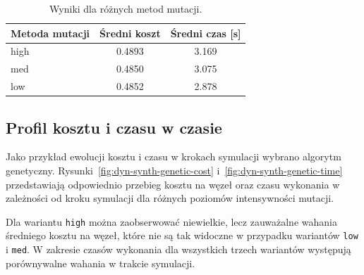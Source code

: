 \begin{table}[H]
    \centering
    \caption{Wyniki dla różnych metod mutacji.}
    \label{tab:dyn-synth-warm}
    \begin{tabular}{lcc}
        \toprule
        \textbf{Metoda mutacji} & \textbf{Średni koszt} & \textbf{Średni czas [s]} \\
        \midrule
        high                    & 0.4893                & 3.169                    \\
        med                     & 0.4850                & 3.075                    \\
        low                     & 0.4852                & 2.878                    \\
        \bottomrule
    \end{tabular}
\end{table}

\subsection{Profil kosztu i czasu w czasie}
Jako przykład ewolucji kosztu i czasu w krokach symulacji wybrano algorytm genetyczny. Rysunki~\ref{fig:dyn-synth-genetic-cost} i~\ref{fig:dyn-synth-genetic-time} przedstawiają odpowiednio przebieg kosztu na węzeł oraz czasu wykonania w zależności od kroku symulacji dla różnych poziomów intensywności mutacji.

Dla wariantu \texttt{high} można zaobserwować niewielkie, lecz zauważalne wahania średniego kosztu na węzeł, które nie są tak widoczne w przypadku wariantów \texttt{low} i \texttt{med}. W zakresie czasów wykonania dla wszystkich trzech wariantów występują porównywalne wahania w trakcie symulacji.

